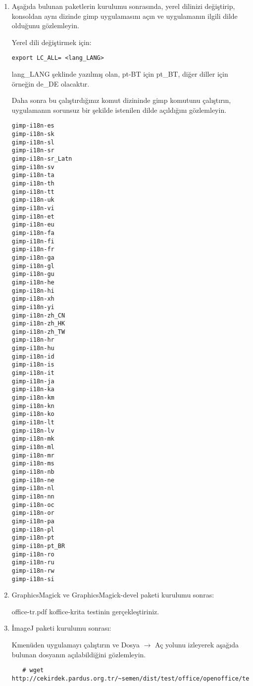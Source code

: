 \documentclass[a4paper,10pt]{article}
\begin{document}
\begin{enumerate}
Aşağıda bulunan komutların sorunsuz olarak çalıştığını gözlemleyin.
\begin{verbatim}
# wget http://cekirdek.pardus.org.tr/~semen/dist/test/multimedia/graphics/test_graphviz.mm
# mm2gv  test_graphviz.mm -o test.gv
# dotty test.gv
# gv2gxl test.gv -o test.gxl 
# gxl2dot test.gxl test.dot
# acyclic test.dot test_asyclic.dot
# lneato test.dot
# vimdot test.dot
\end{verbatim}




 \item Aşağıda bulunan paketlerin kurulumu sonrasında, yerel dilinizi değiştirip, konsoldan aynı dizinde gimp uygulamasını açın ve uygulamanın ilgili dilde olduğunu gözlemleyin.

Yerel dili değiştirmek için:
\begin{verbatim}
export LC_ALL= <lang_LANG>
\end{verbatim}

lang\_LANG şeklinde yazılmış olan, pt-BT için pt\_BT, diğer diller için örneğin de\_DE olacaktır.

Daha sonra bu çalıştırdığınız komut dizininde gimp komutunu çalıştırın, uygulamanın sorunsuz bir şekilde istenilen dilde açıldığını gözlemleyin.
\begin{verbatim}
gimp-i18n-es
gimp-i18n-sk
gimp-i18n-sl
gimp-i18n-sr
gimp-i18n-sr_Latn
gimp-i18n-sv
gimp-i18n-ta
gimp-i18n-th
gimp-i18n-tt
gimp-i18n-uk
gimp-i18n-vi
gimp-i18n-et
gimp-i18n-eu
gimp-i18n-fa
gimp-i18n-fi
gimp-i18n-fr
gimp-i18n-ga
gimp-i18n-gl
gimp-i18n-gu
gimp-i18n-he
gimp-i18n-hi
gimp-i18n-xh
gimp-i18n-yi
gimp-i18n-zh_CN
gimp-i18n-zh_HK
gimp-i18n-zh_TW
gimp-i18n-hr
gimp-i18n-hu
gimp-i18n-id
gimp-i18n-is
gimp-i18n-it
gimp-i18n-ja
gimp-i18n-ka
gimp-i18n-km
gimp-i18n-kn
gimp-i18n-ko
gimp-i18n-lt
gimp-i18n-lv
gimp-i18n-mk
gimp-i18n-ml
gimp-i18n-mr
gimp-i18n-ms
gimp-i18n-nb
gimp-i18n-ne
gimp-i18n-nl
gimp-i18n-nn
gimp-i18n-oc
gimp-i18n-or
gimp-i18n-pa
gimp-i18n-pl
gimp-i18n-pt
gimp-i18n-pt_BR
gimp-i18n-ro
gimp-i18n-ru
gimp-i18n-rw
gimp-i18n-si 
\end{verbatim}


 \item GraphicsMagick ve GraphicsMagick-devel paketi kurulumu sonras:

office-tr.pdf koffice-krita testinin gerçekleştiriniz.

 \item İmageJ paketi kurulumu sonrası:

 Kmenüden uygulamayı çalıştırın ve Dosya $\rightarrow$ Aç yolunu izleyerek aşağıda bulunan dosyanın açılabildiğini gözlemleyin.
  \begin{verbatim}
   # wget http://cekirdek.pardus.org.tr/~semen/dist/test/office/openoffice/test_oodraw.jpg
  \end{verbatim}


\end{enumerate}
\end{document}
